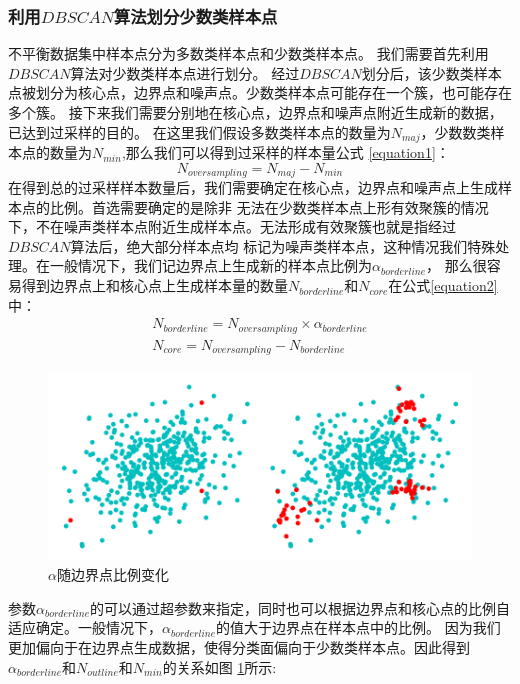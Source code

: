 \documentclass{article}
\begin{document}
\subsubsection{利用$DBSCAN$算法划分少数类样本点}
不平衡数据集中样本点分为多数类样本点和少数类样本点。
我们需要首先利用$DBSCAN$算法对少数类样本点进行划分。
经过$DBSCAN$划分后，该少数类样本点被划分为核心点，边界点和噪声点。少数类样本点可能存在一个簇，也可能存在多个簇。
接下来我们需要分别地在核心点，边界点和噪声点附近生成新的数据，已达到过采样的目的。
在这里我们假设多数类样本点的数量为$N_{maj}$，少数数类样本点的数量为$N_{min}$,那么我们可以得到过采样的样本量公式 \ref{equation1}：
\begin{equation}\label{equation1}
  N_{oversampling}=N_{maj}-N_{min}
\end{equation}
在得到总的过采样样本数量后，我们需要确定在核心点，边界点和噪声点上生成样本点的比例。首选需要确定的是除非
无法在少数类样本点上形有效聚簇的情况下，不在噪声类样本点附近生成样本点。无法形成有效聚簇也就是指经过$DBSCAN$算法后，绝大部分样本点均
标记为噪声类样本点，这种情况我们特殊处理。在一般情况下，我们记边界点上生成新的样本点比例为$\alpha_{borderline}$，
那么很容易得到边界点上和核心点上生成样本量的数量$N_{borderline}$和$N_{core}$在公式\ref{equation2}中：
\begin{equation}
  \label{equation2}
\begin{aligned}
  N_{borderline}=N_{oversampling}\times \alpha_{borderline} \\
  N_{core}=N_{oversampling}-N_{borderline}
\end{aligned}
\end{equation}

\begin{figure}
  \centering
  \includegraphics[width=.8\textwidth]{myplot1.png}
  \caption{$\alpha$随边界点比例变化}
  \label{fig1}
\end{figure}
参数$\alpha_{borderline}$的可以通过超参数来指定，同时也可以根据边界点和核心点的比例自适应确定。一般情况下，$\alpha_{borderline}$的值大于边界点在样本点中的比例。
因为我们更加偏向于在边界点生成数据，使得分类面偏向于少数类样本点。因此得到$\alpha_{borderline}$和$N_{outline}$和$N_{min}$的关系如图 \ref {fig1}所示:
\end{document}
